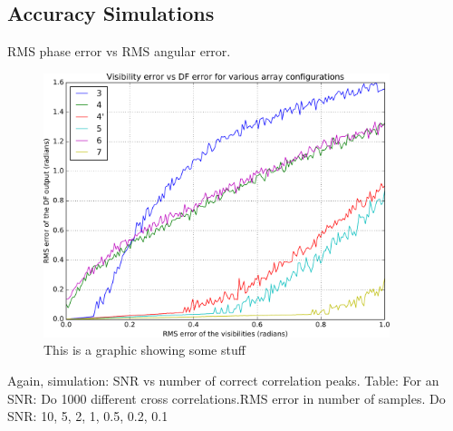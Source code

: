 \subsection{Accuracy Simulations}
RMS phase error vs RMS angular error.
\begin{figure}
  \centering
  \includegraphics[width=0.9\textwidth]{visibility-error-vs-df-error}
  \caption{This is a graphic showing some stuff}
\end{figure}

Again, simulation:
SNR vs number of correct correlation peaks.
Table: 
For an SNR: Do 1000 different cross correlations.RMS error in number of samples.
Do SNR: 10, 5, 2, 1, 0.5, 0.2, 0.1
